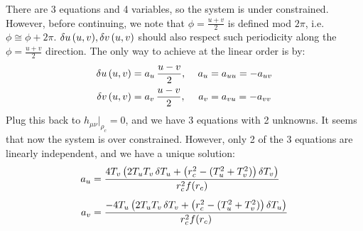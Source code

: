 \documentclass[12pt,a4paper,utf8]{article}
\begin{document}
	There are 3 equations and 4 variables, so the system is under constrained. However, before continuing, we note that $\phi = \frac{u + v}{2}$ is defined mod $2\pi$, i.e.~$\phi \cong \phi + 2\pi$. $\mathinner{\delta u}(u,v),\mathinner{\delta v}(u,v)$ should also respect such periodicity along the $\phi = \frac{u + v}{2}$ direction. The only way to achieve at the linear order is by:
	\begin{equation}
	\begin{aligned}
		\var{u}(u,v) &= a_u\,\frac{u - v}{2},\ %
			& a_u &= a_{uu} = -a_{uv} \\
		\var{v}(u,v) &= a_v\,\frac{u - v}{2},
			& a_v &= a_{vu} = -a_{vv}
	\end{aligned}
	\end{equation}
	Plug this back to $
		h_{\mu\nu}|_{\rho_c}
		= 0
	$, and we have 3 equations with 2 unknowns. It seems that now the system is over constrained. However, only 2 of the 3 equations are linearly independent, and we have a unique solution:
	\begin{equation}
	\begin{aligned}
		a_u &= \frac{
			4T_v \left(
				2T_u T_v \mathinner{\delta T_u}
				+ \left(r_c^2 - (T_u^2 + T_v^2)\right) \mathinner{\delta T_v}
			\right)
		}{r_c^2 f(r_c)}
	\\[1ex]
		a_v &= \frac{
			-4T_u \left(
				2T_u T_v \mathinner{\delta T_v}
				+ \left(r_c^2 - (T_u^2 + T_v^2)\right) \mathinner{\delta T_u}
			\right)
		}{r_c^2 f(r_c)}
	\end{aligned}
	\end{equation}
	


\vspace{\baselineskip}

 



\end{document}
